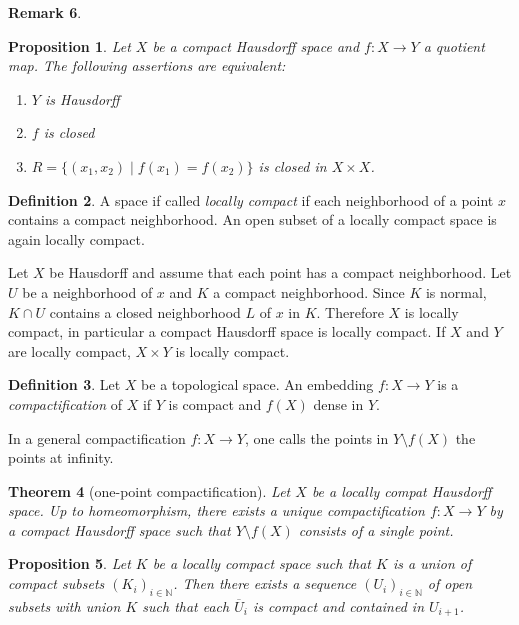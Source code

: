 \documentclass[11pt,a4paper]{article}
\theoremstyle{definition}
\newtheorem{definition}{Definition}[section]
\newtheorem{remark}[definition]{Remark}
\theoremstyle{plain}
\newtheorem{theorem}[definition]{Theorem}
\newtheorem{proposition}[definition]{Proposition}
\theoremstyle{remark}
\begin{document}
\begin{remark}
\begin{proposition}
  Let $X$ be a compact Hausdorff space and $f \colon X \to Y$ a quotient map. The following assertions are equivalent: 
  \begin{enumerate}
    \item $Y$ is Hausdorff
    \item $f$ is closed 
    \item $R = \{(x_1, x_2) \mid f(x_1) = f(x_2)\}$ is closed in $X \times X$. 
  \end{enumerate}
\end{proposition}

\begin{definition}
  A space if called \emph{locally compact} if each neighborhood of a point $x$ contains a 
  compact neighborhood. An open subset of a locally compact space is again locally compact. 
\end{definition}

Let $X$ be Hausdorff and assume that each point has a compact neighborhood. Let $U$ be a 
neighborhood of $x$ and $K$ a compact neighborhood. Since $K$ is normal, $K \cap U$ contains a closed neighborhood $L$ of $x$ 
in $K$. Therefore $X$ is locally compact, in particular a compact Hausdorff space is locally compact. 
If $X$ and $Y$ are locally compact, $X \times Y$ is locally compact. 

\begin{definition}
  Let $X$ be a topological space. An embedding $f \colon X \to Y$ is a \emph{compactification} of $X$ 
  if $Y$ is compact and $f(X)$ dense in $Y$. 

  In a general compactification $f \colon X \to Y$, one calls the points in $Y \setminus f(X)$ the points at infinity. 
\end{definition}

\begin{theorem}[one-point compactification]
  Let $X$ be a locally compat Hausdorff space. Up to homeomorphism, there exists 
  a unique compactification $f \colon X \to Y$ by a compact Hausdorff space such 
  that $Y \setminus f(X)$ consists of a single point. 
\end{theorem}

\begin{proposition}
  Let $K$ be a locally compact space such that $K$ is a union of compact subsets $(K_i)_{i \in \mathbb{N}}$. 
  Then there exists a sequence $(U_i)_{i \in \mathbb{N}}$ of open subsets with union $K$ such that 
  each $\overline{U}_i$ is compact and contained in $U_{i+1}$.  
\end{proposition}


\end{remark}
\end{document}
